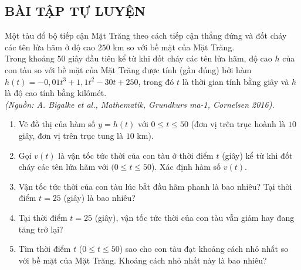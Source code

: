 \subsection{BÀI TẬP TỰ LUYỆN}
\begin{bt}
	Một tàu đổ bộ tiếp cận Mặt Trăng theo cách tiếp cận thẳng đứng và đốt cháy các tên lửa hãm ở độ cao $250$ km so với bề mặt của Mặt Trăng.\\
	Trong khoảng $50$ giây đầu tiên kể từ khi đốt cháy các tên lửa hãm, độ cao $h$ của con tàu so với bề mặt của Mặt Trăng được tính (gần đúng) bởi hàm $h(t)=-0{,}01t^3+1{,}1t^2-30t+250$, trong đó $t$ là thời gian tính bằng giây và $h$ là độ cao tính bằng kilômét.\\
	\textit{(Nguồn: A. Bigalke et al., Mathematik, Grundkurs ma-1, Cornelsen 2016).}
	\begin{enumerate}
		\item Vẽ đồ thị của hàm số $y=h(t)$ với $0\leq t\leq 50$ (đơn vị trên trục hoành là $10$ giây, đơn vị trên trục tung là $10$ km).
		\item Gọi $v(t)$ là vận tốc tức thời của con tàu ở thời điểm $t$ (giây) kể từ khi đốt cháy các tên lửa hãm với $(0\leq t\leq 50$). Xác định hàm số $v(t)$.
		\item Vận tốc tức thời của con tàu lúc bắt đầu hãm phanh là bao nhiêu? Tại thời điểm $t=25$ (giây) là bao nhiêu?
		\item Tại thời điểm $t=25$ (giây), vận tốc tức thời của con tàu vẫn giảm hay đang tăng trở lại?
		\item Tìm thời điểm $t$ ($0\leq t\leq 50$) sao cho con tàu đạt khoảng cách nhỏ nhất so với bề mặt của Mặt Trăng. Khoảng cách nhỏ nhất này là bao nhiêu?
	\end{enumerate}
\end{bt}
